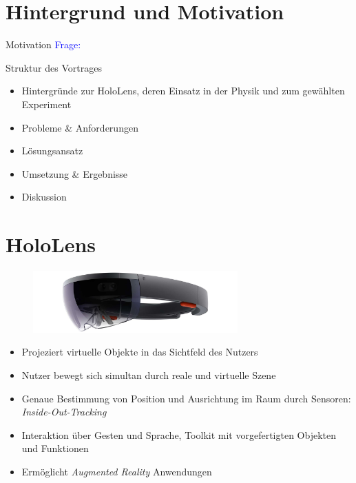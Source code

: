 \part{Hintergrund und Motivation}
\label{part:intro}

\begin{frame}[fragile]{Motivation}
\vspace{10px}
\textcolor{blue}{Frage:} 
\end{frame}

\begin{frame}[fragile]{Struktur des Vortrages}
\begin{itemize}
	\item Hintergründe zur HoloLens, deren Einsatz in der Physik und zum gewählten Experiment
	\item Probleme \& Anforderungen
	\item Lösungsansatz
	\item Umsetzung \& Ergebnisse
	\item Diskussion
\end{itemize}
\end{frame}

\part{HoloLens}
\label{part:hololens}
\begin{frame}[fragile]{}
\vspace{-5px}
\begin{figure}[h!]
	\centering
	\includegraphics[width=0.7\textwidth]{images/papers/hololens.jpg}
\end{figure}
\begin{itemize}
	\item Projeziert virtuelle Objekte in das Sichtfeld des Nutzers
	\item Nutzer bewegt sich simultan durch reale und virtuelle Szene
	\pause
	\item Genaue Bestimmung von Position und Ausrichtung im Raum durch Sensoren: \textit{Inside-Out-Tracking}
	\item Interaktion über Gesten und Sprache, Toolkit mit vorgefertigten Objekten und Funktionen
	\pause
	\item Ermöglicht \textit{Augmented Reality} Anwendungen
\end{itemize}	
\end{frame}

